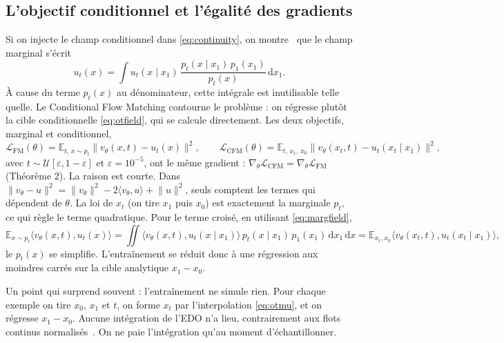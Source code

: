 \documentclass[11pt]{article}
\begin{document}
\subsection{L'objectif conditionnel et l'égalité des gradients}
\label{sec:cfm}

Si on injecte le champ conditionnel dans \eqref{eq:continuity}, on montre~\cite{lipman2023flow} que le champ
marginal s'écrit
\begin{equation}
u_t(x) = \int u_t(x \mid x_1)\, \frac{p_t(x \mid x_1)\, p_1(x_1)}{p_t(x)}\, \mathrm{d}x_1.
\label{eq:margfield}
\end{equation}
À cause du terme $p_t(x)$ au dénominateur, cette intégrale est inutilisable telle quelle. Le Conditional Flow
Matching contourne le problème : on régresse plutôt la cible conditionnelle \eqref{eq:otfield}, qui se calcule
directement. Les deux objectifs, marginal et conditionnel,
\begin{equation}
\mathcal{L}_{\text{FM}}(\theta) = \mathbb{E}_{t,\,x\sim p_t}\big\lVert v_\theta(x,t) - u_t(x)\big\rVert^2,
\qquad
\mathcal{L}_{\text{CFM}}(\theta) = \mathbb{E}_{t,\,x_1,\,x_0}\big\lVert v_\theta(x_t,t) - u_t(x_t \mid x_1)\big\rVert^2,
\label{eq:lcfm}
\end{equation}
avec $t \sim \mathcal{U}[\varepsilon,1-\varepsilon]$ et $\varepsilon = 10^{-5}$, ont le même gradient :
$\nabla_\theta \mathcal{L}_{\text{CFM}} = \nabla_\theta \mathcal{L}_{\text{FM}}$ (Théorème 2). La raison est
courte. Dans $\lVert v_\theta - u\rVert^2 = \lVert v_\theta\rVert^2 - 2\langle v_\theta, u\rangle + \lVert
u\rVert^2$, seuls comptent les termes qui dépendent de $\theta$. La loi de $x_t$ (on tire $x_1$ puis $x_0$)
est exactement la marginale $p_t$, ce qui règle le terme quadratique. Pour le terme croisé, en utilisant
\eqref{eq:margfield},
\[
\mathbb{E}_{x\sim p_t}\langle v_\theta(x,t), u_t(x)\rangle
= \iint \big\langle v_\theta(x,t), u_t(x\mid x_1)\big\rangle\, p_t(x\mid x_1)\, p_1(x_1)\, \mathrm{d}x_1\,\mathrm{d}x
= \mathbb{E}_{x_1,x_0}\big\langle v_\theta(x_t,t), u_t(x_t\mid x_1)\big\rangle,
\]
le $p_t(x)$ se simplifie. L'entraînement se réduit donc à une régression aux moindres carrés sur la cible
analytique $x_1 - x_0$.

Un point qui surprend souvent : l'entraînement ne simule rien. Pour chaque exemple on tire $x_0$, $x_1$ et
$t$, on forme $x_t$ par l'interpolation \eqref{eq:otmu}, et on régresse $x_1 - x_0$. Aucune intégration de
l'EDO n'a lieu, contrairement aux flots continus normalisés~\cite{chen2018neuralode}. On ne paie
l'intégration qu'au moment d'échantillonner.
\end{document}
